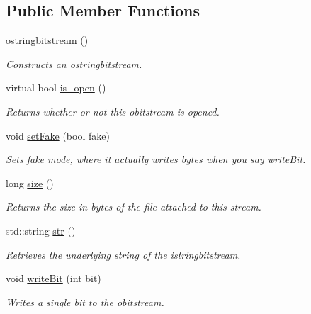 \subsection*{Public Member Functions}
\begin{DoxyCompactItemize}
\item 
\mbox{\hyperlink{classostringbitstream_a923b090c481c5ae2d59a45a4ebac5a24}{ostringbitstream}} ()
\begin{DoxyCompactList}\small\item\em Constructs an ostringbitstream. \end{DoxyCompactList}\item 
virtual bool \mbox{\hyperlink{classobitstream_a2f57f54d8c03b615bb31eee091d8a88a}{is\+\_\+open}} ()
\begin{DoxyCompactList}\small\item\em Returns whether or not this obitstream is opened. \end{DoxyCompactList}\item 
void \mbox{\hyperlink{classobitstream_ad916b4624eb09d375514964f867b475c}{set\+Fake}} (bool fake)
\begin{DoxyCompactList}\small\item\em Sets \textquotesingle{}fake\textquotesingle{} mode, where it actually writes bytes when you say write\+Bit. \end{DoxyCompactList}\item 
long \mbox{\hyperlink{classobitstream_a22727e9c338fb1aaa6722031445373c3}{size}} ()
\begin{DoxyCompactList}\small\item\em Returns the size in bytes of the file attached to this stream. \end{DoxyCompactList}\item 
std\+::string \mbox{\hyperlink{classostringbitstream_a615ccd723733653b9e6a2d72563f1cab}{str}} ()
\begin{DoxyCompactList}\small\item\em Retrieves the underlying string of the istringbitstream. \end{DoxyCompactList}\item 
void \mbox{\hyperlink{classobitstream_a487c88ba2560a4657d18c3edb7d9d247}{write\+Bit}} (int bit)
\begin{DoxyCompactList}\small\item\em Writes a single bit to the obitstream. \end{DoxyCompactList}\end{DoxyCompactItemize}


